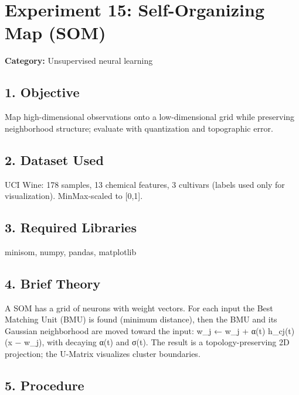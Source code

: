 
\chapter{Experiment 15: Self-Organizing Map
(SOM)}\label{experiment-15-self-organizing-map-som}

\textbf{Category:} Unsupervised neural learning

\section{1. Objective}\label{objective}

Map high-dimensional observations onto a low-dimensional grid while
preserving neighborhood structure; evaluate with quantization and
topographic error.

\section{2. Dataset Used}\label{dataset-used}

UCI Wine: 178 samples, 13 chemical features, 3 cultivars (labels used
only for visualization). MinMax-scaled to {[}0,1{]}.

\section{3. Required Libraries}\label{required-libraries}

minisom, numpy, pandas, matplotlib

\section{4. Brief Theory}\label{brief-theory}

A SOM has a grid of neurons with weight vectors. For each input the Best
Matching Unit (BMU) is found (minimum distance), then the BMU and its
Gaussian neighborhood are moved toward the input: w\_j ← w\_j + α(t)
h\_cj(t) (x − w\_j), with decaying α(t) and σ(t). The result is a
topology-preserving 2D projection; the U-Matrix visualizes cluster
boundaries.

\section{5. Procedure}\label{procedure}

